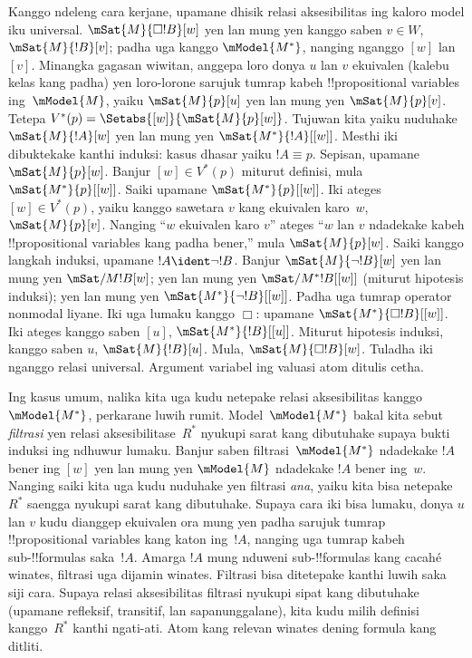 \documentclass[../../../include/open-logic-section]{subfiles}
\begin{document}
Kanggo ndeleng cara kerjane, upamane dhisik relasi aksesibilitas ing kaloro model iku
universal. $\mSat{M}{\Box !B}[w]$ yen lan mung yen kanggo saben
$v \in W$, $\mSat{M}{!B}[v]$; padha uga kanggo $\mModel{M^*}$,
nanging nganggo $[w]$ lan $[v]$. Minangka gagasan wiwitan, anggepa
loro donya $u$ lan $v$ ekuivalen (kalebu kelas kang padha) yen loro-lorone
sarujuk tumrap kabeh !!{propositional variable}s ing~$\mModel{M}$,
yaiku $\mSat{M}{p}[u]$ yen lan mung yen $\mSat{M}{p}[v]$.
Tetepa $V^*(p) = \Setabs{[w]}{\mSat{M}{p}[w]}$. Tujuwan kita yaiku
nuduhake $\mSat{M}{!A}[w]$ yen lan mung yen
$\mSat{M^*}{!A}[{[w]}]$. Mesthi iki dibuktekake kanthi induksi:
kasus dhasar yaiku $!A \equiv p$. Sepisan, upamane
$\mSat{M}{p}[w]$. Banjur $[w] \in V^*(p)$ miturut definisi, mula
$\mSat{M^*}{p}[{[w]}]$. Saiki upamane
$\mSat{M^*}{p}[{[w]}]$. Iki ateges $[w] \in V^*(p)$, yaiku kanggo
sawetara $v$ kang ekuivalen karo~$w$, $\mSat{M}{p}[v]$. Nanging
``$w$ ekuivalen karo $v$'' ateges ``$w$ lan $v$ ndadekake kabeh
!!{propositional variable}s kang padha bener,'' mula
$\mSat{M}{p}[w]$. Saiki kanggo langkah induksi, upamane $!A
\ident \lnot !B$. Banjur $\mSat{M}{\lnot !B}[w]$ yen lan mung yen
$\mSat/{M}{!B}[w]$; yen lan mung yen
$\mSat/{M^*}{!B}[{[w]}]$ (miturut hipotesis induksi); yen lan mung yen
$\mSat{M^*}{\lnot !B}[{[w]}]$. Padha uga tumrap operator nonmodal
liyane. Iki uga lumaku kanggo $\Box$: upamane
$\mSat{M^*}{\Box
  !B}[{[w]}]$. Iki ateges kanggo saben $[u]$,
$\mSat{M^*}{!B}[{[u]}]$. Miturut hipotesis induksi, kanggo saben $u$,
$\mSat{M}{!B}[u]$. Mula, $\mSat{M}{\Box !B}[w]$. Tuladha iki nganggo relasi universal. Argument variabel ing valuasi atom ditulis cetha.

Ing kasus umum, nalika kita uga kudu netepake relasi aksesibilitas
kanggo $\mModel{M^*}$, perkarane luwih rumit. Model~$\mModel{M^*}$
bakal kita sebut \emph{filtrasi} yen relasi aksesibilitase~$R^*$
nyukupi sarat kang dibutuhake supaya bukti induksi ing ndhuwur lumaku.
Banjur saben filtrasi~$\mModel{M^*}$ ndadekake $!A$ bener ing $[w]$
yen lan mung yen $\mModel{M}$ ndadekake $!A$ bener ing~$w$. Nanging
saiki kita uga kudu nuduhake yen filtrasi \emph{ana}, yaiku kita bisa
netepake~$R^*$ saengga nyukupi sarat kang dibutuhake. Supaya cara iki
bisa lumaku, donya $u$ lan $v$ kudu dianggep ekuivalen ora mung yen
padha sarujuk tumrap !!{propositional variable}s kang katon ing~$!A$, nanging uga
tumrap kabeh sub-!!{formula}s saka~$!A$. Amarga $!A$ mung nduweni
sub-!!{formula}s kang cacahé winates, filtrasi uga dijamin winates.
Filtrasi bisa ditetepake kanthi luwih saka siji cara. Supaya relasi
aksesibilitas filtrasi nyukupi sipat kang dibutuhake (upamane
refleksif, transitif, lan sapanunggalane), kita kudu milih definisi
kanggo~$R^*$ kanthi ngati-ati. Atom kang relevan winates dening formula kang ditliti.
\end{document}
